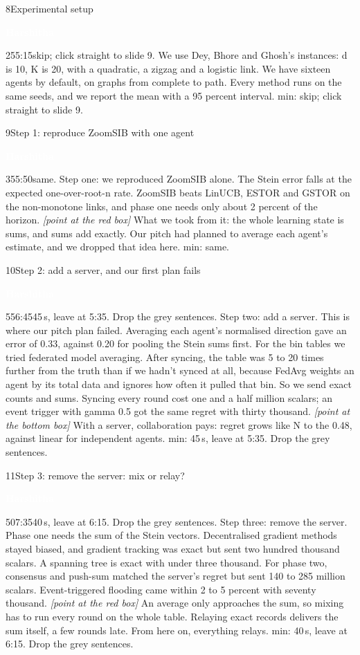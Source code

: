 \documentclass[12pt,a4paper]{article}
\newcommand{\Hb}{\colorbox{harsh}{\strut\textcolor{white}{\textbf{\small Harshitha}}}}
\newcommand{\cut}[1]{\textcolor{cutc}{#1}}
\newcommand{\cue}[1]{{\small\itshape\color{bar}[#1]}}
\newenvironment{slide}[6]
  {\begin{slidebox}{#1}{#2}{#3}{#4}{#5}{#6}\gdef\fifteen{#6}}
  {\tcblower 15 min: \fifteen\end{slidebox}}
\begin{document}
\begin{slide}{8}{Experimental setup}{\Hb}{25}{5:15}{skip; click straight to slide 9.}
We use Dey, Bhore and Ghosh's instances: d is 10, K is 20, with a quadratic, a zigzag and a logistic link. We have
sixteen agents by default, on graphs from complete to path. Every method runs on the same seeds, and we report the mean
with a 95 percent interval.
\end{slide}

\begin{slide}{9}{Step 1: reproduce ZoomSIB with one agent}{\Hb}{35}{5:50}{same.}
Step one: we reproduced ZoomSIB alone. The Stein error falls at the expected one-over-root-n rate. ZoomSIB beats
LinUCB, ESTOR and GSTOR on the non-monotone links, and phase one needs only about 2 percent of the horizon.
\cue{point at the red box} What we took from it: the whole learning state is sums, and sums add exactly. Our pitch
had planned to average each agent's estimate, and we dropped that idea here.
\end{slide}

\begin{slide}{10}{Step 2: add a server, and our first plan fails}{\Hb}{55}{6:45}{45\,s, leave at 5:35. Drop the grey sentences.}
Step two: add a server. This is where our pitch plan failed. Averaging each agent's normalised direction gave an error
of 0.33, against 0.20 for pooling the Stein sums first. For the bin tables we tried federated model averaging. After
syncing, the table was 5 to 20 times further from the truth than if we hadn't synced at all, because FedAvg weights an
agent by its total data and ignores how often it pulled that bin. So we send exact counts and sums. \cut{Syncing every
round cost one and a half million scalars; an event trigger with gamma 0.5 got the same regret with thirty thousand.}
\cue{point at the bottom box} With a server, collaboration pays: regret grows like N to the 0.48, against linear for
independent agents.
\end{slide}

\begin{slide}{11}{Step 3: remove the server: mix or relay?}{\Hb}{50}{7:35}{40\,s, leave at 6:15. Drop the grey sentences.}
Step three: remove the server. Phase one needs the sum of the Stein vectors. \cut{Decentralised gradient methods stayed
biased, and gradient tracking was exact but sent two hundred thousand scalars.} A spanning tree is exact with under
three thousand. For phase two, consensus and push-sum matched the server's regret but sent 140 to 285 million scalars.
Event-triggered flooding came within 2 to 5 percent with seventy thousand. \cue{point at the red box} An average only
approaches the sum, so mixing has to run every round on the whole table. Relaying exact records delivers the sum
itself, a few rounds late. From here on, everything relays.
\end{slide}
\end{document}
